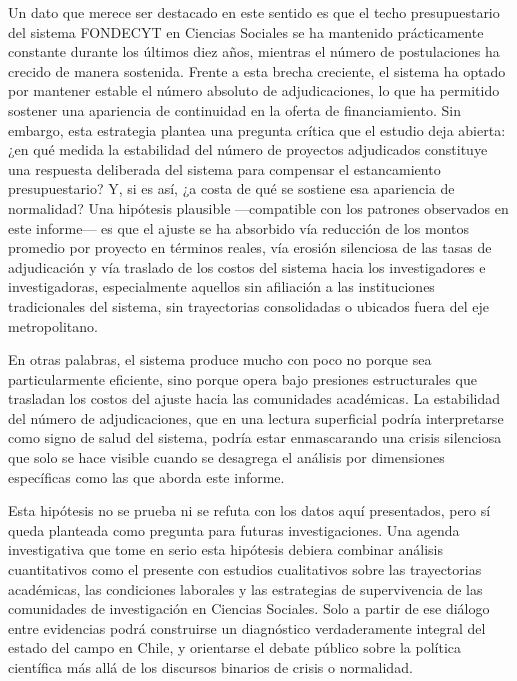 \documentclass[
  spanish,
  a4paper,
  oneside]{scrbook}
\begin{document}
Un dato que merece ser destacado en este sentido es que el techo
presupuestario del sistema FONDECYT en Ciencias Sociales se ha mantenido
prácticamente constante durante los últimos diez años, mientras el
número de postulaciones ha crecido de manera sostenida. Frente a esta
brecha creciente, el sistema ha optado por mantener estable el número
absoluto de adjudicaciones, lo que ha permitido sostener una apariencia
de continuidad en la oferta de financiamiento. Sin embargo, esta
estrategia plantea una pregunta crítica que el estudio deja abierta: ¿en
qué medida la estabilidad del número de proyectos adjudicados constituye
una respuesta deliberada del sistema para compensar el estancamiento
presupuestario? Y, si es así, ¿a costa de qué se sostiene esa apariencia
de normalidad? Una hipótesis plausible ---compatible con los patrones
observados en este informe--- es que el ajuste se ha absorbido vía
reducción de los montos promedio por proyecto en términos reales, vía
erosión silenciosa de las tasas de adjudicación y vía traslado de los
costos del sistema hacia los investigadores e investigadoras,
especialmente aquellos sin afiliación a las instituciones tradicionales
del sistema, sin trayectorias consolidadas o ubicados fuera del eje
metropolitano.

En otras palabras, el sistema produce mucho con poco no porque sea
particularmente eficiente, sino porque opera bajo presiones
estructurales que trasladan los costos del ajuste hacia las comunidades
académicas. La estabilidad del número de adjudicaciones, que en una
lectura superficial podría interpretarse como signo de salud del
sistema, podría estar enmascarando una crisis silenciosa que solo se
hace visible cuando se desagrega el análisis por dimensiones específicas
como las que aborda este informe.

Esta hipótesis no se prueba ni se refuta con los datos aquí presentados,
pero sí queda planteada como pregunta para futuras investigaciones. Una
agenda investigativa que tome en serio esta hipótesis debiera combinar
análisis cuantitativos como el presente con estudios cualitativos sobre
las trayectorias académicas, las condiciones laborales y las estrategias
de supervivencia de las comunidades de investigación en Ciencias
Sociales. Solo a partir de ese diálogo entre evidencias podrá
construirse un diagnóstico verdaderamente integral del estado del campo
en Chile, y orientarse el debate público sobre la política científica
más allá de los discursos binarios de crisis o normalidad.

\end{document}
